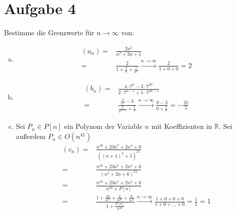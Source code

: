 \documentclass{scrreprt}
\newcommand{\RR}{\mathbb{R}}
\begin{document}
	\section*{Aufgabe 4}
		Bestimme die Grenzwerte für $n \to \infty$ von:
			\begin{enumerate}[(a)]
				\item
					\begin{align*}
						(a_n) =& \frac{2n^2}{n^2 + 3n + 1}\\
						= & \frac{2}{1 + \frac{3}{n} + \frac{1}{n^2}} \xrightarrow{n \to \infty} \frac{2}{1 + 0 + 0} = 2
					\end{align*}
				\item
					\begin{align*}
						(b_n) =& \frac{4 \cdot 7^n  - 3 \cdot 7^{2n}}{2 \cdot 7^{n-1} + 5 \cdot 7^{2n -1}}\\
						= & \frac{\frac{4}{7^n}  - 3 }{\frac{2}{7^{n+1}} + \frac{5}{7}} \xrightarrow{n \to \infty} \frac{0 - 3}{0 + \frac{5}{7}} = -\frac{21}{5}
					\end{align*}
				\item
					Sei $P_n \in P[n]$ ein Polynom der Variable $n$ mit Koeffizienten in $\RR$. Sei außerdem $P_n \in O(n^{41})$
					\begin{align*}
						(c_n) =& \frac{n^{42} + 23n^7 + 2n^4 + 6}{((n+1)^2 + 5)^{21}}\\
						=& \frac{n^{42} + 23n^7 + 2n^4 + 6}{(n^2 + 2n + 6)^{21}}\\
						=& \frac{n^{42} + 23n^7 + 2n^4 + 6}{n^{42} + P[n]}\\
						=& \frac{1 + \frac{23}{n^{35}} + \frac{2}{n^{38}} + \frac{6}{n^{42}}}{1 + \frac{P[n]}{n^{42}}} \xrightarrow{n \to \infty} \frac{1 + 0 + 0 + 0}{1 + 0 + \dots + 0} = \frac{1}{1} = 1
					\end{align*}
			\end{enumerate}

\pagebreak
\end{document}
